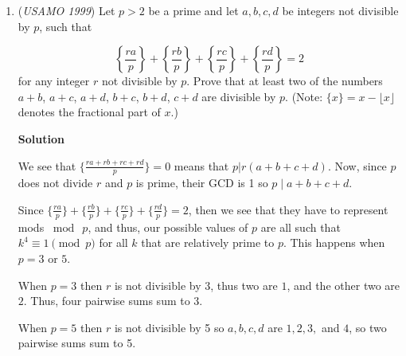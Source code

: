 \begin{enumerate}
 This is equivalent to by sum-to-product and use of $\cos x = \sin (90^\circ - x)$:

 
 \[|\sin \frac{x-z}{2} \sin \frac{y+w}{2}| + |\sin \frac{y-w}{2} \sin \frac{x+z}{2}| \ge 2|\sin \frac{x-z}{2} \sin \frac{y-w}{2}|.\]

 Clearly $90^\circ \ge \frac{x+z}{2} > \frac{x-z}{2} \ge 0^\circ$. As sine is increasing over $[0, \pi/2]$, $|\sin \frac{x+z}{2}| > |\sin \frac{x-z}{2}|$.

 Similarly, $|\sin \frac{y+w}{2}| > |\sin \frac{y-w}{2}|$. The result now follows after multiplying the first inequality by $|\sin \frac{x-z}{2}|$, the second by $|\sin \frac{y-w}{2}|$, and adding. (Equality holds if and only if $x=z$ and $y=w$, ie. $ABCD$ is a parallelogram.)

 --\href{https://artofproblemsolving.com/wiki/index.php?title=User:Suli&action=edit&redlink=1}{Suli} 11:23, 5 October 2014 (EDT)

 


	\item (\textit{USAMO 1999}) Let $p > 2$ be a prime and let $a,b,c,d$ be integers not divisible by $p$, such that

 \[\left\{ \dfrac{ra}{p} \right\} + \left\{ \dfrac{rb}{p} \right\} + \left\{ \dfrac{rc}{p} \right\} + \left\{ \dfrac{rd}{p} \right\} = 2\]
for any integer $r$ not divisible by $p$. Prove that at least two of the numbers $a+b$, $a+c$, $a+d$, $b+c$, $b+d$, $c+d$ are divisible by $p$.
(Note: $\{x\} = x - \lfloor x \rfloor$ denotes the fractional part of $x$.)


 



\textbf{Solution}

We see that $\biggl\{\frac{ra+rb+rc+rd}{p}\biggr\}=0$ means that $p|r(a+b+c+d)$. Now, since $p$ does not divide $r$ and $p$ is prime, their GCD is 1 so $p\mathrel{|}a+b+c+d$.

 Since $\biggl\{\frac{ra}{p}\biggr\}+\biggl\{\frac{rb}{p}\biggr\}+\biggl\{\frac{rc}{p}\biggr\}+\biggl\{\frac{rd}{p}\biggr\}=2$, then we see that they have to represent mods $\bmod\medspace p$, and thus, our possible values of $p$ are all such that $k^4 \equiv 1\pmod{p}$  for all $k$ that are relatively prime to $p$. This happens when $p=3$ or $5$. 

 When $p=3$ then $r$ is not divisible by 3, thus two are $1$, and the other two are $2$. Thus, four pairwise sums sum to 3.

 When $p=5$ then $r$ is not divisible by 5 so $a, b, c, d$ are $1, 2, 3,$ and $4$, so two pairwise sums sum to 5.


\end{enumerate}
